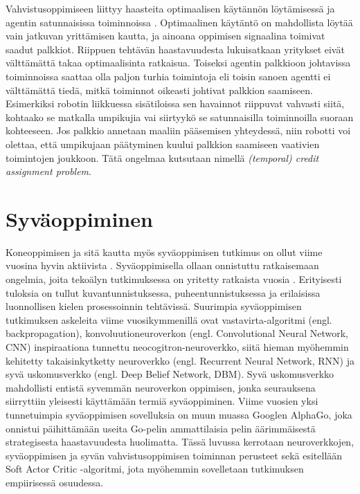 \documentclass[utf8]{gradu3}
\begin{document}
Vahvistusoppimiseen liittyy haasteita optimaalisen käytännön löytämisessä ja agentin satunnaisissa toiminnoissa \parencite{arulkumaran2017brief}. Optimaalinen käytäntö on mahdollista löytää vain jatkuvan yrittämisen kautta, ja ainoana oppimisen signaalina toimivat saadut palkkiot. Riippuen tehtävän haastavuudesta lukuisatkaan yritykset eivät välttämättä takaa optimaalisinta ratkaisua. Toiseksi agentin palkkioon johtavissa toiminnoissa saattaa olla paljon turhia toimintoja eli toisin sanoen agentti ei välttämättä tiedä, mitkä toiminnot oikeasti johtivat palkkion saamiseen. Esimerkiksi robotin liikkuessa sisätiloissa sen havainnot riippuvat vahvasti siitä, kohtaako se matkalla umpikujia vai siirtyykö se satunnaisilla toiminnoilla suoraan kohteeseen. Jos palkkio annetaan maaliin pääsemisen yhteydessä, niin robotti voi olettaa, että umpikujaan päätyminen kuului palkkion saamiseen vaativien toimintojen joukkoon. Tätä ongelmaa kutsutaan nimellä \textit{(temporal) credit assignment problem}.

\section{Syväoppiminen}

Koneoppimisen ja sitä kautta myös syväoppimisen tutkimus on ollut viime vuosina hyvin aktiivista \parencite{pouyanfar2018survey}. Syväoppimisella ollaan onnistuttu ratkaisemaan ongelmia, joita tekoälyn tutkimuksessa on yritetty ratkaista vuosia \parencite{lecun2015deep,pouyanfar2018survey}. Erityisesti tuloksia on tullut kuvantunnistuksessa, puheentunnistuksessa ja erilaisissa luonnollisen kielen prosessoinnin tehtävissä. Suurimpia syväoppimisen tutkimuksen askeleita viime vuosikymmenillä ovat vastavirta-algoritmi (engl. backpropagation), konvoluutioneuroverkon (engl. Convolutional Neural Network, CNN) inspiraationa tunnettu neocogitron-neuroverkko, siitä hieman myöhemmin kehitetty takaisinkytketty neuroverkko (engl. Recurrent Neural Network, RNN) ja syvä uskomusverkko (engl. Deep Belief Network, DBM). Syvä uskomusverkko mahdollisti entistä syvemmän neuroverkon oppimisen, jonka seurauksena siirryttiin yleisesti käyttämään termiä syväoppiminen. Viime vuosien yksi tunnetuimpia syväoppimisen sovelluksia on muun muassa Googlen AlphaGo, joka onnistui päihittämään useita Go-pelin ammattilaisia pelin äärimmäisestä strategisesta haastavuudesta huolimatta. Tässä luvussa kerrotaan neuroverkkojen, syväoppimisen ja syvän vahvistusoppimisen toiminnan perusteet sekä esitellään Soft Actor Critic -algoritmi, jota myöhemmin sovelletaan tutkimuksen empiirisessä osuudessa.
\end{document}
